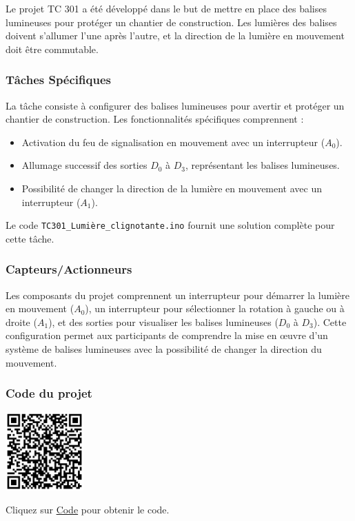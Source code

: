 \documentclass[a4paper,12pt]{report}
\begin{document}
Le projet TC 301 a été développé dans le but de mettre en place des balises lumineuses pour protéger un chantier de construction. Les lumières des balises doivent s'allumer l'une après l'autre, et la direction de la lumière en mouvement doit être commutable.

\subsubsection{Tâches Spécifiques}

La tâche consiste à configurer des balises lumineuses pour avertir et protéger un chantier de construction. Les fonctionnalités spécifiques comprennent :
\begin{itemize}
    \item Activation du feu de signalisation en mouvement avec un interrupteur (\(A_0\)).
    \item Allumage successif des sorties \(D_0\) à \(D_3\), représentant les balises lumineuses.
    \item Possibilité de changer la direction de la lumière en mouvement avec un interrupteur (\(A_1\)).
\end{itemize}
Le code \texttt{TC301\_Lumière\_clignotante.ino} fournit une solution complète pour cette tâche.

\subsubsection{Capteurs/Actionneurs}

Les composants du projet comprennent un interrupteur pour démarrer la lumière en mouvement (\(A_0\)), un interrupteur pour sélectionner la rotation à gauche ou à droite (\(A_1\)), et des sorties pour visualiser les balises lumineuses (\(D_0\) à \(D_3\)). Cette configuration permet aux participants de comprendre la mise en œuvre d'un système de balises lumineuses avec la possibilité de changer la direction du mouvement.

\subsubsection{Code du projet}

\begin{minipage}{0.5\textwidth}
    \includegraphics[height=3cm]{Code TC301.png}
\end{minipage}%
\begin{minipage}{0.5\textwidth}
    Cliquez sur \href{https://github.com/DexterTaha/Controllino-PLC-Sample/blob/main/TC300/TC301_Lumi%C3%A8re_clignotante/TC301_Lumi%C3%A8re_clignotante.ino}{Code} pour obtenir le code.
\end{minipage}
\end{document}
